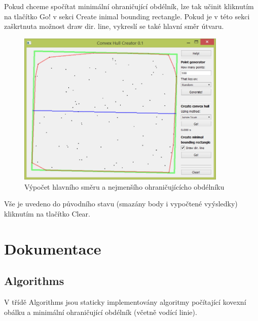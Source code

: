 \documentclass[a4paper, 12pt]{article}
\begin{document}
Pokud chceme spočítat minimální ohraničující obdélník, lze tak učinit kliknutím
 na tlačítko Go! v sekci  Create inimal bounding rectangle. Pokud je v této sekci
 zaškrtnuta možnost draw dir. line, vykreslí se také hlavní směr útvaru.\\
\begin{figure}[h!]
	\centering
	\includegraphics[width=10cm]{min_bound.jpg}
	\caption{Výpočet hlavního směru a nejmenšího ohraničujícícho obdélníku}
\end{figure}

Vše je uvedeno do původního stavu (smazány body i vypočtené vyýsledky) kliknutím na tlačítko Clear.\\

\clearpage

\section{Dokumentace}

\subsection{Algorithms}
V třídě Algorithms jsou staticky implementovány algoritmy počítající kovexní obálku a minimální ohraničující obdélník (včetně vodící linie).
\end{document}
